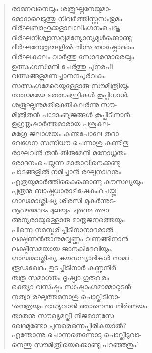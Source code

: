 \begin{verse}
രാമനവനെയും ശത്രുഘ്നനേയുമാ-\\
മോദാലെടുത്തു നിവര്‍ത്തിസ്സസംഭ്രമം\\
ദീര്‍ഘബാഹുക്കളാലാലിംഗനംചെദ്യ്തു\\
ദീര്‍ഘനിശ്വാസവുമന്യോന്യമുള്‍ക്കൊണ്ടു\\
ദീര്‍ഘനേത്രങ്ങളില്‍ നിന്നു ബാഷ്പോദകം\\
ദീര്‍ഘകാലം വാര്‍ത്തു സോദരന്മാരെയും\\
ഉത്സംഗസീമനി ചേര്‍ത്തു പുനരപി\\
വത്സങ്ങളുമണച്ചാനന്ദപൂര്‍വകം\\
സത്സംഗമേറെയുള്ളോരു സൗമിത്രിയും\\
തത്സമയേ ഭരതാംഘ്രികള്‍ കൂപ്പിനാന്‍.\\
ശത്രുഘ്നനുമതിഭക്തികലര്‍ന്നു സൗ-\\
മിത്രിതന്‍ പാദാംബുജങ്ങള്‍ കൂപ്പീടിനാന്‍.\\
ഉഗ്രതൃഷാര്‍ത്തമാരായ പശുകുല-\\
മഗ്രേ ജലാശയം കണ്ടപോലേ തദാ\\
വേഗേന സന്നിധൗ ചെന്നാശു കണ്ടിതു\\
രാഘവന്‍ തന്‍ തിരുമേനി മനോധൃതം.\\
രോദനംചെയ്യുന്ന മാതാവിനെക്കണ്ടു\\
പാദങ്ങളില്‍ നമിച്ചാന്‍ രഘുനാഥനും\\
എത്രയുമാര്‍ത്തികൈക്കൊണ്ടു കൗസല്യയും\\
പുത്രനു ബാഷ്പധാരാഭിഷേകംചെയ്തു\\
ഗാഢമാശ്ലിഷ്യ ശിരസി മുകര്‍ന്നുട-\\
നൂഢമോദം മുലയും ചുരന്നു തദാ.\\
അന്യരായുള്ളൊരു മാതൃജനത്തെയും\\
പിന്നെ നമസ്കരിച്ചീടിനാനാദരാല്‍.\\
ലക്ഷ്മണന്‍താനുമവ്വണ്ണം വണങ്ങിനാന്‍\\
ലക്ഷ്മീസമയായ ജാനകീദേവിയും.\\
ഗാഢമാശ്ലിഷ്യ കൗസല്യാദികള്‍ സമാ-\\
രൂഢഖേദം തുടച്ചീടിനാര്‍ കണ്ണുനീര്‍.\\
തത്ര സമാഗതം ദൃഷ്ട്വാ ഗുരുവരം\\
ഭക്ത്യാ വസിഷ്ഠം സാഷ്ടാംഗമാമ്മാറുടന്‍\\
നത്വാ രഘൂത്തമനാശു ചൊല്ലീടിനാ-\\
‘നെത്രയും ഭാഗ്യവാന്‍ ഞാനെന്നു നിര്‍ണയം.\\
താതനു സൗഖ്യമല്ലീ നിജമാനസേ\\
ഖേദമുണ്ടോ പുനരെന്നെപ്പിരികയാല്‍?\\
എന്തോന്നു ചൊന്നതെന്നോടു ചൊല്ലീടുവാ-\\
നെന്തു സൗമിത്രിയെക്കൊണ്ടു പറഞ്ഞതും.’\\

\end{verse}
